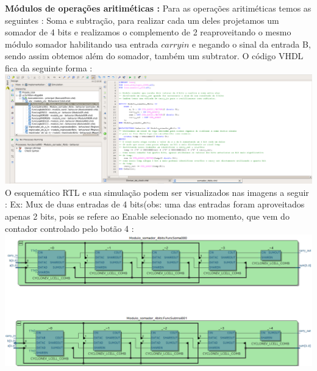 \documentclass[11pt]{book}
\begin{document}
\textbf{Módulos de operações aritiméticas :} 
\newline\newline
Para as operações aritiméticas temos as seguintes : Soma e subtração, para realizar cada um deles projetamos um somador de 4 bits e realizamos o complemento de 2 reaproveitando o mesmo módulo somador habilitando usa entrada $carry in$ e negando o sinal da entrada B, sendo assim obtemos além do somador, também um subtrator. 
O código VHDL fica da seguinte forma :
\newline\newline
\includegraphics[width=1.1\textwidth]{codigo_somador.png}
\newline
O esquemático RTL e sua simulação podem ser visualizados nas imagens a seguir :
\newline
Ex: Mux de duas entradas de 4 bits(obs: uma das entradas foram aproveitados apenas 2 bits, pois se refere ao Enable selecionado no momento, que vem do contador controlado pelo botão 4 :
\newline
\newline
\includegraphics[width=1.1\textwidth]{RTL_modulo_somador_subtrator.png}%
\newline\newline
\end{document}
